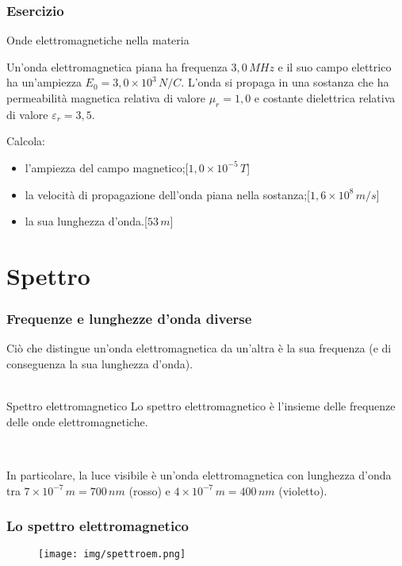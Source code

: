 \documentclass[]{beamer}
\theoremstyle{plain}
\begin{document}
\begin{frame}
\frametitle{Esercizio}
\begin{exampleblock}{Onde elettromagnetiche nella materia}
\small{
Un'onda elettromagnetica piana ha frequenza $ 3,0 \, MHz $ e il suo campo elettrico ha un'ampiezza $ E_0 = 3,0 \times 10^{3} \, N/C $. L'onda si propaga in una sostanza che ha permeabilità magnetica relativa di valore $ \mu_r = 1,0 $ e costante dielettrica relativa di valore $ \varepsilon_r = 3,5 $.

Calcola:
  \begin{itemize}
    \item l'ampiezza del campo magnetico;\hspace*{\fill}[$ 1,0 \times 10^{-5} \, T $]
    \item la velocità di propagazione dell'onda piana nella sostanza;\hspace*{\fill}[$ 1,6 \times 10^{8} \, m/s $]
    \item la sua lunghezza d'onda.\hspace*{\fill}[$ 53 \, m $]
  \end{itemize}
  }
\end{exampleblock}
\end{frame}



\section{Spettro}

\begin{frame}
\frametitle{Frequenze e lunghezze d'onda diverse}
  Ciò che distingue un'onda elettromagnetica da un'altra è la sua frequenza (e di conseguenza la sua lunghezza d'onda).\\\pause~\\
  \begin{block}{Spettro elettromagnetico}
    Lo spettro elettromagnetico è l'insieme delle frequenze delle onde elettromagnetiche.
  \end{block}\pause
  
  ~
  
  In particolare, la \alert{luce visibile} è un'onda elettromagnetica con lunghezza d'onda tra $ 7 \times 10^{-7} \, m = 700 \, nm $ (rosso) e $ 4 \times 10^{-7} \, m = 400 \, nm $ (violetto).
\end{frame}


\begin{frame}
\frametitle{Lo spettro elettromagnetico}
  \begin{figure}
  \texttt{[image: img/spettroem.png]}
  \end{figure}
\end{frame}
\end{document}
